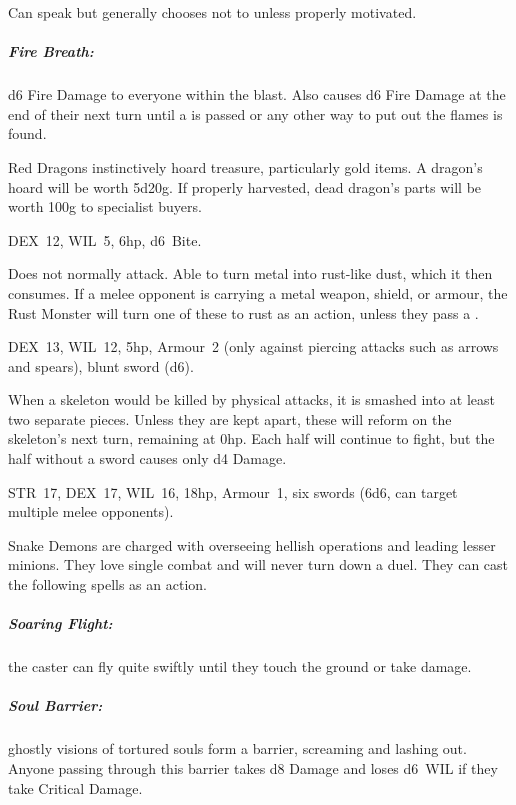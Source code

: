 \documentclass[itdr]{subfiles}
\begin{document}
Can speak but generally chooses not to unless properly motivated.

\subparagraph{Fire Breath:} d6 Fire Damage to everyone within the blast. Also causes d6 Fire Damage at the end of their next turn until a  is passed or any other way to put out the flames is found.

Red Dragons instinctively hoard treasure, particularly gold items. A dragon's hoard will be worth 5d20g. If properly harvested, dead dragon's parts will be worth 100g to specialist buyers.

\vfill
\break

\vfill

DEX~12, WIL~5, 6hp, d6~Bite.

Does not normally attack. Able to turn metal into rust-like dust, which it then consumes. If a melee opponent is carrying a metal weapon, shield, or armour, the Rust Monster will turn one of these to rust as an action, unless they pass a .

\vfill

DEX~13, WIL~12, 5hp, Armour~2 (only against piercing attacks such as arrows and spears), blunt sword (d6).

When a skeleton would be killed by physical attacks, it is smashed into at least two separate pieces. Unless they are kept apart, these will reform on the skeleton's next turn, remaining at 0hp. Each half will continue to fight, but the half without a sword causes only d4 Damage.

\vfill


\vspace{-2ex}

STR~17, DEX~17, WIL~16, 18hp, Armour~1, six swords (6d6, can target multiple melee opponents).

Snake Demons are charged with overseeing hellish operations and leading lesser minions. They love single combat and will never turn down a duel. They can cast the following spells as an action.

\vfill
\break

\subparagraph{Soaring Flight:} the caster can fly quite swiftly until they touch the ground or take damage.

\subparagraph{Soul Barrier:} ghostly visions of tortured souls form a barrier, screaming and lashing out. Anyone passing through this barrier takes d8 Damage and loses d6~WIL if they take Critical Damage.
\end{document}
